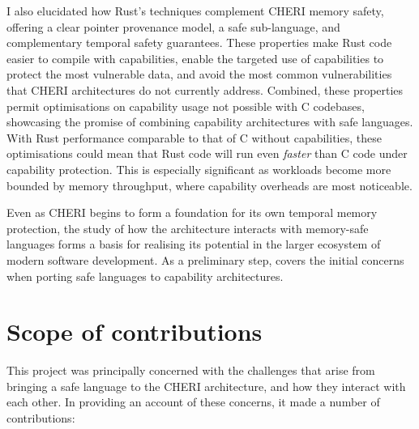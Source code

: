 \documentclass[dissertation.tex]{subfiles}
\begin{document}
I also elucidated how Rust's techniques complement CHERI memory safety,
offering a clear pointer provenance model, a safe sub-language, and
complementary temporal safety guarantees.
These properties make Rust code easier to compile with capabilities,
enable the targeted use of capabilities to protect the most vulnerable
data, and avoid the most common vulnerabilities that
CHERI architectures do not currently address.
Combined, these properties permit optimisations on capability usage not
possible with C codebases, showcasing the promise of combining
capability architectures with safe languages.
With Rust performance comparable to that of C without capabilities,
these optimisations could mean that Rust code will run even \emph{faster}
than C code under capability protection.
This is especially significant as workloads become more bounded by memory
throughput, where capability overheads are most noticeable.

Even as CHERI begins to form a foundation for its own temporal memory
protection, the study of how the architecture interacts with memory-safe
languages forms a basis for realising its potential in the larger
ecosystem of modern software development.
As a preliminary step,  covers the initial
concerns when porting safe languages to capability architectures.



\section{Scope of contributions}

This project was principally concerned with the challenges that arise
from bringing a safe language to the CHERI architecture, and how they
interact with each other.
In providing an account of these concerns, it made a number of
contributions:

\end{document}
